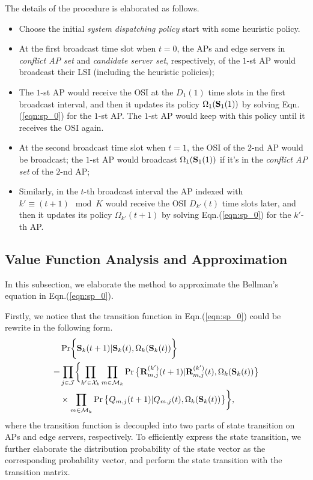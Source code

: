 The details of the procedure is elaborated as follows.
\begin{itemize}
    \item Choose the initial \emph{system dispatching policy} start with some heuristic policy.
    \item At the first broadcast time slot when $t=0$, the APs and edge servers in \emph{conflict AP set} and \emph{candidate server set}, respectively, of the $1$-st AP would broadcast their LSI (including the heuristic policies);
    \item The $1$-st AP would receive the OSI at the $D_1(1)$ time slots in the first broadcast interval, and then it updates its policy $\Omega_{1}(\mathbf{S}_{1}(1))$ by solving Eqn.(\ref{eqn:sp_0}) for the $1$-st AP.
    The $1$-st AP would keep with this policy until it receives the OSI again.
    \item At the second broadcast time slot when $t=1$, the OSI of the $2$-nd AP would be broadcast;
    the $1$-st AP would broadcast $\Omega_{1}(\mathbf{S}_{1}(1))$ if it's in the \emph{conflict AP set} of the $2$-nd AP;
    \item Similarly, in the $t$-th broadcast interval the AP indexed with $k' \equiv (t + 1)\mod{K}$ would receive the OSI $D_{k'}(t)$ time slots later, and then it updates its policy $\Omega_{k'}(t+1)$ by solving Eqn.(\ref{eqn:sp_0}) for the $k'$-th AP.
\end{itemize}


\subsection{Value Function Analysis and Approximation}
In this subsection, we elaborate the method to approximate the Bellman's equation in Eqn.(\ref{eqn:sp_0}).

Firstly, we notice that the transition function in Eqn.(\ref{eqn:sp_0}) could be rewrite in the following form.
\begin{align}
    & \Pr\Brace{ \Stat_{k}(t+1)|\Stat_{k}(t), \Omega_{k}(\Stat_{k}(t)) }
    \nonumber\\
    =& \prod_{j\in\jSpace} \Brace{
        \prod_{k'\in\ccSet_{k}}\prod_{m\in\esSet_{k}} \Pr\big\{
            \vec{R}^{(k')}_{m,j}(t+1) | \vec{R}^{(k')}_{m,j}(t), \Omega_{k}(\Stat_{k}(t))
        \big\}
        \nonumber\\
        &\times \prod_{m\in\esSet_{k}} \Pr\big\{
            Q_{m,j}(t+1) | Q_{m,j}(t), \Omega_{k}(\Stat_{k}(t))
        \big\}
    },
\end{align}
where the transition function is decoupled into two parts of state transition on APs and edge servers, respectively.
To efficiently express the state transition, we further elaborate the distribution probability of the state vector as the corresponding probability vector, and perform the state transition with the transition matrix.

